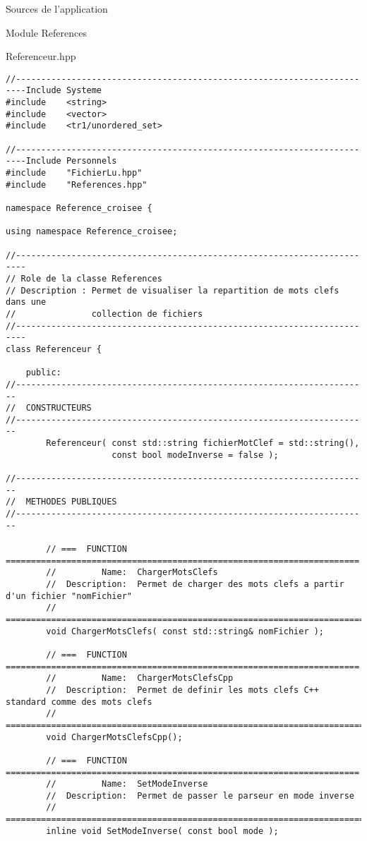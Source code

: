 \documentclass{article}
\begin{document}
\begin{section}{Sources de l'application}
\begin{subsection}{Module References}
\begin{paragraph}{Referenceur.hpp}
\begin{verbatim}
//------------------------------------------------------------------------Include Systeme
#include    <string>
#include    <vector>
#include    <tr1/unordered_set>

//------------------------------------------------------------------------Include Personnels
#include    "FichierLu.hpp"
#include    "References.hpp"

namespace Reference_croisee {

using namespace Reference_croisee;

//------------------------------------------------------------------------
// Role de la classe References
// Description : Permet de visualiser la repartition de mots clefs dans une
//               collection de fichiers
//------------------------------------------------------------------------
class Referenceur {

    public:
//----------------------------------------------------------------------
//  CONSTRUCTEURS
//----------------------------------------------------------------------
        Referenceur( const std::string fichierMotClef = std::string(),
                     const bool modeInverse = false );

//----------------------------------------------------------------------
//  METHODES PUBLIQUES
//----------------------------------------------------------------------

        // ===  FUNCTION  ======================================================================
        //         Name:  ChargerMotsClefs
        //  Description:  Permet de charger des mots clefs a partir d'un fichier "nomFichier" 
        // =====================================================================================
        void ChargerMotsClefs( const std::string& nomFichier );
        
        // ===  FUNCTION  ======================================================================
        //         Name:  ChargerMotsClefsCpp
        //  Description:  Permet de definir les mots clefs C++ standard comme des mots clefs
        // =====================================================================================
        void ChargerMotsClefsCpp();
        
        // ===  FUNCTION  ======================================================================
        //         Name:  SetModeInverse
        //  Description:  Permet de passer le parseur en mode inverse
        // =====================================================================================
        inline void SetModeInverse( const bool mode );


\end{verbatim}
\end{paragraph}
\end{subsection}
\end{section}
\end{document}
